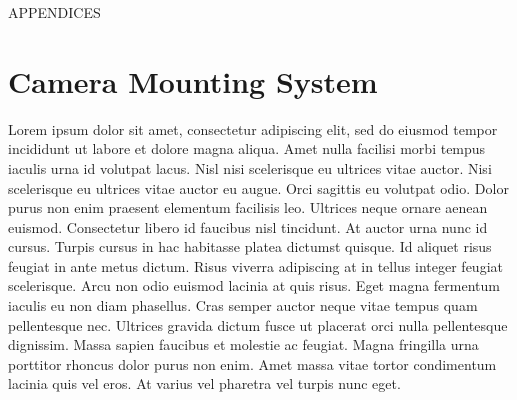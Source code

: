\begin{appendices}

\begin{center}
		 \fontsize{50}{60}\selectfont APPENDICES
\end{center}
\thispagestyle{empty}
\newpage

\chapter{Camera Mounting System}
\label{appendix:mount-sys}

Lorem ipsum dolor sit amet, consectetur adipiscing elit, sed do eiusmod tempor incididunt ut labore et dolore magna aliqua. Amet nulla facilisi morbi tempus iaculis urna id volutpat lacus. Nisl nisi scelerisque eu ultrices vitae auctor. Nisi scelerisque eu ultrices vitae auctor eu augue. Orci sagittis eu volutpat odio. Dolor purus non enim praesent elementum facilisis leo. Ultrices neque ornare aenean euismod. Consectetur libero id faucibus nisl tincidunt. At auctor urna nunc id cursus. Turpis cursus in hac habitasse platea dictumst quisque. Id aliquet risus feugiat in ante metus dictum. Risus viverra adipiscing at in tellus integer feugiat scelerisque. Arcu non odio euismod lacinia at quis risus. Eget magna fermentum iaculis eu non diam phasellus. Cras semper auctor neque vitae tempus quam pellentesque nec. Ultrices gravida dictum fusce ut placerat orci nulla pellentesque dignissim. Massa sapien faucibus et molestie ac feugiat. Magna fringilla urna porttitor rhoncus dolor purus non enim. Amet massa vitae tortor condimentum lacinia quis vel eros. At varius vel pharetra vel turpis nunc eget.



\end{appendices}

